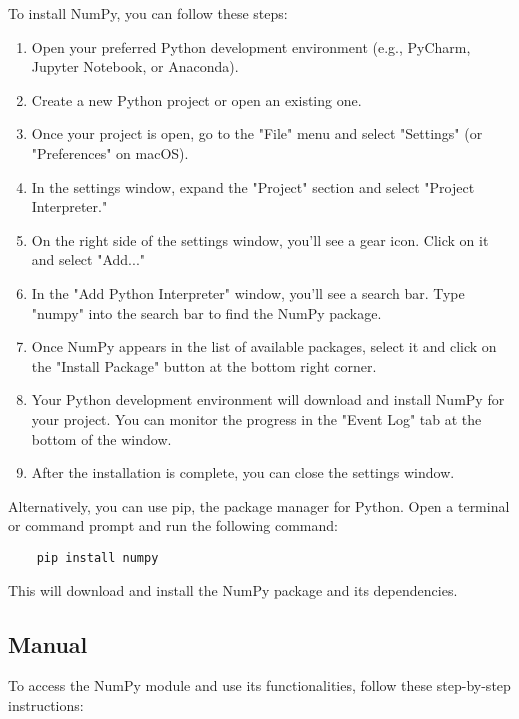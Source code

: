 To install NumPy, you can follow these steps:

\begin{enumerate}
	\item Open your preferred Python development environment (e.g., PyCharm, Jupyter Notebook, or Anaconda).
	\item Create a new Python project or open an existing one.
	\item Once your project is open, go to the "File" menu and select "Settings" (or "Preferences" on macOS).
	\item In the settings window, expand the "Project" section and select "Project Interpreter."
	\item On the right side of the settings window, you'll see a gear icon. Click on it and select "Add..."
	\item In the "Add Python Interpreter" window, you'll see a search bar. Type "numpy" into the search bar to find the NumPy package.
	\item Once NumPy appears in the list of available packages, select it and click on the "Install Package" button at the bottom right corner.
	\item Your Python development environment will download and install NumPy for your project. You can monitor the progress in the "Event Log" tab at the bottom of the window.
	\item After the installation is complete, you can close the settings window.
\end{enumerate}

Alternatively, you can use pip, the package manager for Python. Open a terminal or command prompt and run the following command:

\begin{verbatim}
	pip install numpy
\end{verbatim}

This will download and install the NumPy package and its dependencies.

\subsection{Manual}

To access the NumPy module and use its functionalities, follow these step-by-step instructions:

